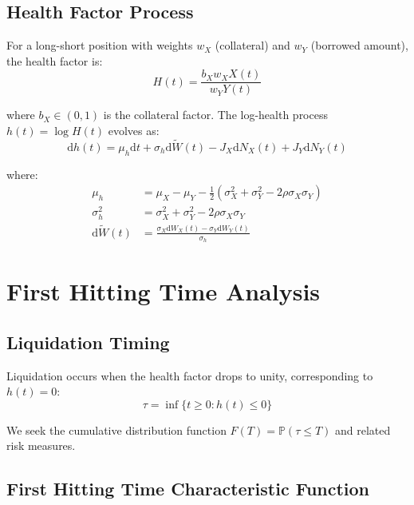 \documentclass{article}
\renewcommand{\P}{\mathbb{P}}
\newcommand{\diff}{\mathrm{d}}
\theoremstyle{definition}
\begin{document}
\subsection{Health Factor Process}

For a long-short position with weights $w_X$ (collateral) and $w_Y$ (borrowed amount), the health factor is:
\begin{equation}
H(t) = \frac{b_X w_X X(t)}{w_Y Y(t)} \label{eq:health_factor}
\end{equation}

where $b_X \in (0,1)$ is the collateral factor. The log-health process $h(t) = \log H(t)$ evolves as:
\begin{equation}
\diff h(t) = \mu_h \diff t + \sigma_h \diff \tilde{W}(t) - J_X \diff N_X(t) + J_Y \diff N_Y(t) \label{eq:log_health_dynamics}
\end{equation}

where:
\begin{align}
\mu_h &= \mu_X - \mu_Y - \frac{1}{2}(\sigma_X^2 + \sigma_Y^2 - 2\rho\sigma_X\sigma_Y) \\
\sigma_h^2 &= \sigma_X^2 + \sigma_Y^2 - 2\rho\sigma_X\sigma_Y \\
\diff \tilde{W}(t) &= \frac{\sigma_X \diff W_X(t) - \sigma_Y \diff W_Y(t)}{\sigma_h}
\end{align}

\section{First Hitting Time Analysis}

\subsection{Liquidation Timing}

Liquidation occurs when the health factor drops to unity, corresponding to $h(t) = 0$:
\begin{equation}
\tau = \inf\{t \geq 0 : h(t) \leq 0\} \label{eq:stopping_time}
\end{equation}

We seek the cumulative distribution function $F(T) = \P(\tau \leq T)$ and related risk measures.

\subsection{First Hitting Time Characteristic Function}
\end{document}

